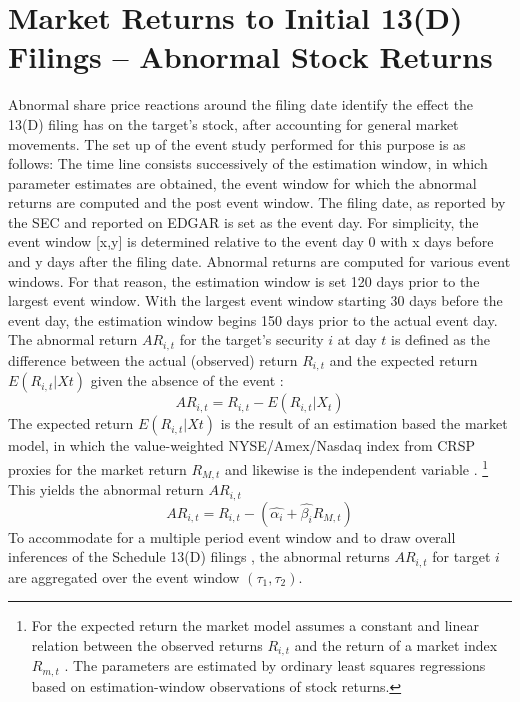 \documentclass[12pt]{article}
\begin{document}
\section{Market Returns to Initial 13(D) Filings -- Abnormal Stock Returns}
Abnormal share price reactions around the filing date identify the effect the 13(D) filing has on the target's stock, after accounting for general market movements.
The set up of the event study performed for this purpose is as follows: The time line consists successively of the estimation window, in which parameter estimates are obtained, the event window for which the abnormal returns are computed and the post event window. 
The filing date, as reported by the SEC and reported on EDGAR is set as the event day. For simplicity, the event window [x,y] is determined relative to the event day 0 with x days before and y days after the filing date. Abnormal returns are computed for various event windows. For that reason, the estimation window is set 120 days prior to the largest event window. With the largest event window starting 30 days before the event day, the estimation window begins 150 days prior to the actual event day.\\
The abnormal return $AR_{i,t}$ for the target's security $i$ at day $t$ is defined as the difference between the actual (observed) return $R_{i,t}$ and the expected return $E(R_{i,t}|X{t})$ given the absence of the event \citep[p.15]{MacKinlay1997}:
	\begin{equation}\label{eq:1}
		AR_{i,t}=R_{i,t}-E(R_{i,t}|X_{t})
	\end{equation}
The expected return $E(R_{i,t}|X{t})$ is the result of an estimation based the market model, in which the value-weighted NYSE/Amex/Nasdaq index from CRSP proxies for the market return $R_{M,t}$ and likewise is the independent variable \citep[p.18]{MacKinlay1997}.
	\footnote{For the expected return the market model assumes a constant and linear relation between the observed returns $R_{i,t}$ and the return of a market index $R_{m,t}$ \citep[p.18]{MacKinlay1997}. The parameters are estimated by ordinary least squares regressions based on estimation-window observations of stock returns.}
This yields the abnormal return $AR_{i,t}$
	\begin{equation}\label{eq:2}
		AR_{i,t}=R_{i,t}-(\hat{\alpha_{i}}+\hat{\beta_{i}}R_{M,t})
	\end{equation}
To accommodate for a multiple period event window and to draw overall inferences of the Schedule 13(D) filings \citep[p.21]{MacKinlay1997}, the abnormal returns $AR_{i,t}$ for target $i$ are aggregated over the event window $(\tau_1,\tau_2)$. 
\end{document}
